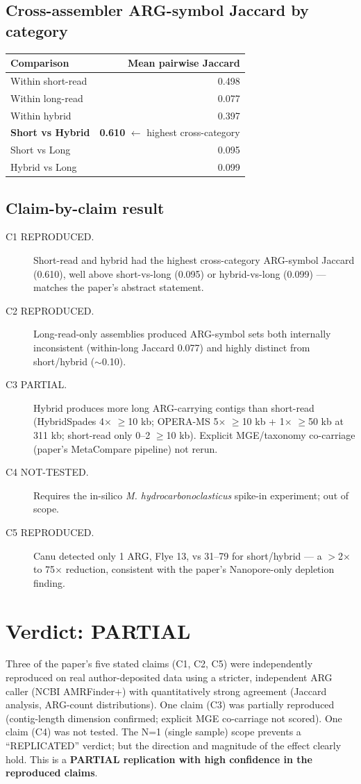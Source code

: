 \documentclass[11pt]{article}
\begin{document}
\subsection{Cross-assembler ARG-symbol Jaccard by category}
\begin{tabular}{lr}
\toprule
Comparison & Mean pairwise Jaccard \\
\midrule
Within short-read       & 0.498 \\
Within long-read        & 0.077 \\
Within hybrid           & 0.397 \\
\textbf{Short vs Hybrid} & \textbf{0.610} $\leftarrow$ highest cross-category \\
Short vs Long           & 0.095 \\
Hybrid vs Long          & 0.099 \\
\bottomrule
\end{tabular}

\subsection{Claim-by-claim result}
\begin{description}
\item[C1 REPRODUCED.] Short-read and hybrid had the highest cross-category ARG-symbol Jaccard (0.610), well above short-vs-long (0.095) or hybrid-vs-long (0.099) --- matches the paper's abstract statement.
\item[C2 REPRODUCED.] Long-read-only assemblies produced ARG-symbol sets both internally inconsistent (within-long Jaccard 0.077) and highly distinct from short/hybrid ($\sim$0.10).
\item[C3 PARTIAL.] Hybrid produces more long ARG-carrying contigs than short-read (HybridSpades 4$\times$ $\geq$10 kb; OPERA-MS 5$\times$ $\geq$10 kb + 1$\times$ $\geq$50 kb at 311 kb; short-read only 0--2 $\geq$10 kb). Explicit MGE/taxonomy co-carriage (paper's MetaCompare pipeline) not rerun.
\item[C4 NOT-TESTED.] Requires the in-silico \textit{M. hydrocarbonoclasticus} spike-in experiment; out of scope.
\item[C5 REPRODUCED.] Canu detected only 1 ARG, Flye 13, vs 31--79 for short/hybrid --- a $>$2$\times$ to 75$\times$ reduction, consistent with the paper's Nanopore-only depletion finding.
\end{description}

\section{Verdict: PARTIAL}
Three of the paper's five stated claims (C1, C2, C5) were independently reproduced on real author-deposited data using a stricter, independent ARG caller (NCBI AMRFinder+) with quantitatively strong agreement (Jaccard analysis, ARG-count distributions). One claim (C3) was partially reproduced (contig-length dimension confirmed; explicit MGE co-carriage not scored). One claim (C4) was not tested. The N=1 (single sample) scope prevents a ``REPLICATED'' verdict; but the direction and magnitude of the effect clearly hold. This is a \textbf{PARTIAL replication with high confidence in the reproduced claims}.
\end{document}
